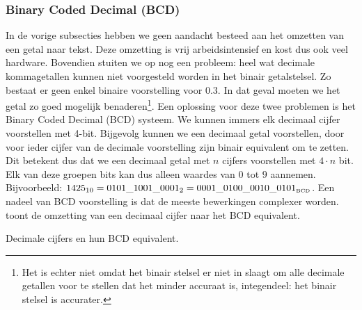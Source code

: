 \subsubsection{Binary Coded Decimal (BCD)}
In de vorige subsecties hebben we geen aandacht besteed aan het omzetten van een getal naar tekst. Deze omzetting is vrij arbeidsintensief en kost dus ook veel hardware. Bovendien stuiten we op nog een probleem: heel wat decimale kommagetallen kunnen niet voorgesteld worden in het binair getalstelsel. Zo bestaat er geen enkel binaire voorstelling voor $0.3$. In dat geval moeten we het getal zo goed mogelijk benaderen\footnote{Het is echter niet omdat het binair stelsel er niet in slaagt om alle decimale getallen voor te stellen dat het minder accuraat is, integendeel: het binair stelsel is accurater.}. Een oplossing voor deze twee problemen is het Binary Coded Decimal (BCD) systeem. We kunnen immers elk decimaal cijfer voorstellen met 4-bit. Bijgevolg kunnen we een decimaal getal voorstellen, door voor ieder cijfer van de decimale voorstelling zijn binair equivalent om te zetten. Dit betekent dus dat we een decimaal getal met $n$ cijfers voorstellen met $4\cdot n$ bit. Elk van deze groepen bits kan dus alleen waardes van $0$ tot $9$ aannemen. Bijvoorbeeld: $1425_{10}=0101\_1001\_0001_2=0001\_0100\_0010\_0101_{\mbox{\tiny{BCD}}}$. Een nadeel van BCD voorstelling is dat de meeste bewerkingen complexer worden.  toont de omzetting van een decimaal cijfer naar het BCD equivalent.

\begin{table}[hbt]
\centering
{}
\caption{Decimale cijfers en hun BCD equivalent.}
\end{table}

